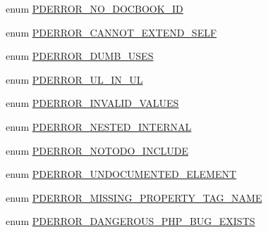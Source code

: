 \begin{DoxyCompactItemize}
enum \hyperlink{_errors_8inc_af146f5aee04afb6c8803cf20c7436c1d}{\-P\-D\-E\-R\-R\-O\-R\-\_\-\-N\-O\-\_\-\-D\-O\-C\-B\-O\-O\-K\-\_\-\-I\-D} 
\item 
enum \hyperlink{_errors_8inc_ae0e65123ea6510be3c4b23177374fbf3}{\-P\-D\-E\-R\-R\-O\-R\-\_\-\-C\-A\-N\-N\-O\-T\-\_\-\-E\-X\-T\-E\-N\-D\-\_\-\-S\-E\-L\-F} 
\item 
enum \hyperlink{_errors_8inc_a7d00b9ae278f0b73af16b47472da40c8}{\-P\-D\-E\-R\-R\-O\-R\-\_\-\-D\-U\-M\-B\-\_\-\-U\-S\-E\-S} 
\item 
enum \hyperlink{_errors_8inc_aa2f7a55be23200c0f3526550596a5ea7}{\-P\-D\-E\-R\-R\-O\-R\-\_\-\-U\-L\-\_\-\-I\-N\-\_\-\-U\-L} 
\item 
enum \hyperlink{_errors_8inc_a87dffef172d3e55f2589f9f98c6a6b5a}{\-P\-D\-E\-R\-R\-O\-R\-\_\-\-I\-N\-V\-A\-L\-I\-D\-\_\-\-V\-A\-L\-U\-E\-S} 
\item 
enum \hyperlink{_errors_8inc_af724ed9a0498428de8c4fc4e073dcbc5}{\-P\-D\-E\-R\-R\-O\-R\-\_\-\-N\-E\-S\-T\-E\-D\-\_\-\-I\-N\-T\-E\-R\-N\-A\-L} 
\item 
enum \hyperlink{_errors_8inc_a4eb59b8b698e86a795db92874ccbabc7}{\-P\-D\-E\-R\-R\-O\-R\-\_\-\-N\-O\-T\-O\-D\-O\-\_\-\-I\-N\-C\-L\-U\-D\-E} 
\item 
enum \hyperlink{_errors_8inc_a4ea14c2983817e261b20b04e4b063acd}{\-P\-D\-E\-R\-R\-O\-R\-\_\-\-U\-N\-D\-O\-C\-U\-M\-E\-N\-T\-E\-D\-\_\-\-E\-L\-E\-M\-E\-N\-T} 
\item 
enum \hyperlink{_errors_8inc_a82c76cbd9236eb2dd5c2b61d10da0815}{\-P\-D\-E\-R\-R\-O\-R\-\_\-\-M\-I\-S\-S\-I\-N\-G\-\_\-\-P\-R\-O\-P\-E\-R\-T\-Y\-\_\-\-T\-A\-G\-\_\-\-N\-A\-M\-E} 
\item 
enum \hyperlink{_errors_8inc_ae23943cdab3a7f940325c6ee36a2c8cd}{\-P\-D\-E\-R\-R\-O\-R\-\_\-\-D\-A\-N\-G\-E\-R\-O\-U\-S\-\_\-\-P\-H\-P\-\_\-\-B\-U\-G\-\_\-\-E\-X\-I\-S\-T\-S} 
\end{DoxyCompactItemize}
